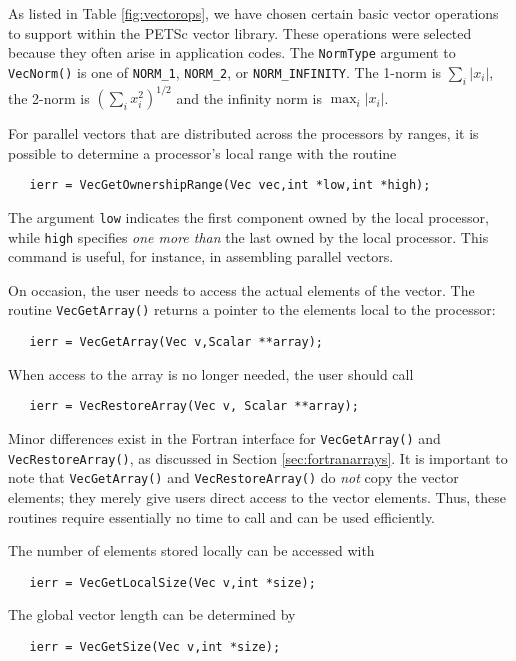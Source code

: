 As listed in Table \ref{fig:vectorops}, we have chosen certain 
basic vector operations to support within the PETSc vector library.
These operations were selected because they often arise in application 
codes. The {\tt NormType} argument to {\tt VecNorm()} is one of 
 {\tt NORM\_1}, {\tt NORM\_2}, or {\tt NORM\_INFINITY}.
   
  The 1-norm is 
$ \sum_i |x_{i}|$, the 2-norm is $( \sum_{i} x_{i}^{2})^{1/2} $ and the 
infinity norm is $ \max_{i} |x_{i}|$. 


For parallel vectors that are distributed across the processors by ranges, 
it is possible to determine 
a processor's local range with the routine
\begin{verbatim}
   ierr = VecGetOwnershipRange(Vec vec,int *low,int *high);
\end{verbatim}
The argument {\tt low} indicates the first component owned by the local 
processor, while {\tt high} specifies {\em one more than} the 
last owned by the local processor.
This command is useful, for instance, in assembling parallel vectors.

On occasion, the user needs to access the actual elements of the vector. 
The routine {\tt VecGetArray()} 
returns a pointer to the elements local to the processor:
\begin{verbatim}
   ierr = VecGetArray(Vec v,Scalar **array);
\end{verbatim}
When access to the array is no longer
needed, the user should call
\begin{verbatim}
   ierr = VecRestoreArray(Vec v, Scalar **array);
\end{verbatim}
Minor differences exist in the Fortran interface for {\tt VecGetArray()} and 
{\tt VecRestoreArray()}, as discussed in Section \ref{sec:fortranarrays}.  
It is important to note that {\tt VecGetArray()} and {\tt VecRestoreArray()}
do {\em not} copy the vector elements; they merely give users direct
access to the vector elements. Thus, these routines require essentially
no time to call and can be used efficiently.

The number of elements stored locally can be accessed with
\begin{verbatim}
   ierr = VecGetLocalSize(Vec v,int *size);
\end{verbatim}
The global vector length can be determined by 
\begin{verbatim}
   ierr = VecGetSize(Vec v,int *size);
\end{verbatim}


